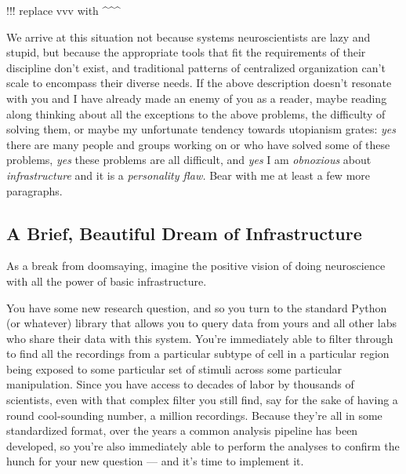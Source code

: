 \documentclass[nohyper]{tufte-book-jls}
\begin{document}
!!! replace vvv with \^{}\^{}\^{}

We arrive at this situation not because systems neuroscientists are lazy
and stupid, but because the appropriate tools that fit the requirements
of their discipline don't exist, and traditional patterns of centralized
organization can't scale to encompass their diverse needs. If the above
description doesn't resonate with you and I have already made an enemy
of you as a reader, maybe reading along thinking about all the
exceptions to the above problems, the difficulty of solving them, or
maybe my unfortunate tendency towards utopianism grates: \emph{yes}
there are many people and groups working on or who have solved some of
these problems, \emph{yes} these problems are all difficult, and
\emph{yes} I am \emph{obnoxious} about \emph{infrastructure} and it is a
\emph{personality flaw.} Bear with me at least a few more paragraphs.

\hypertarget{a-brief-beautiful-dream-of-infrastructure}{%
\subsection{A Brief, Beautiful Dream of
Infrastructure}\label{a-brief-beautiful-dream-of-infrastructure}}

As a break from doomsaying, imagine the positive vision of doing
neuroscience with all the power of basic infrastructure.

You have some new research question, and so you turn to the standard
Python (or whatever) library that allows you to query data from yours
and all other labs who share their data with this system. You're
immediately able to filter through to find all the recordings from a
particular subtype of cell in a particular region being exposed to some
particular set of stimuli across some particular manipulation. Since you
have access to decades of labor by thousands of scientists, even with
that complex filter you still find, say for the sake of having a round
cool-sounding number, a million recordings. Because they're all in some
standardized format, over the years a common analysis pipeline has been
developed, so you're also immediately able to perform the analyses to
confirm the hunch for your new question --- and it's time to implement
it.
\end{document}
